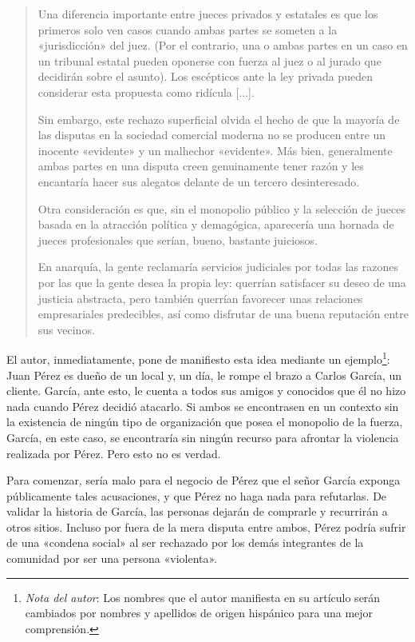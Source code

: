 \documentclass[12pt,a4paper,twoside]{book}
\begin{document}
\begin{quotation}
Una diferencia importante entre jueces privados y estatales es que los primeros solo ven casos cuando ambas partes se someten a la «jurisdicción» del juez. (Por el contrario, una o ambas partes en un caso en un tribunal estatal pueden oponerse con fuerza al juez o al jurado que decidirán sobre el asunto). Los escépticos ante la ley privada pueden considerar esta propuesta como ridícula [...].

Sin embargo, este rechazo superficial olvida el hecho de que la mayoría de las disputas en la sociedad comercial moderna no se producen entre un inocente «evidente» y un malhechor «evidente». Más bien, generalmente ambas partes en una disputa creen genuinamente tener razón y les encantaría hacer sus alegatos delante de un tercero desinteresado.

Otra consideración es que, sin el monopolio público y la selección de jueces basada en la atracción política y demagógica, aparecería una hornada de jueces profesionales que serían, bueno, bastante juiciosos.

En anarquía, la gente reclamaría servicios judiciales por todas las razones por las que la gente desea la propia ley: querrían satisfacer su deseo de una justicia abstracta, pero también querrían favorecer unas relaciones empresariales predecibles, así como disfrutar de una buena reputación entre sus vecinos. \cite{justicia-privada}
\end{quotation}

El autor, inmediatamente, pone de manifiesto esta idea mediante un ejemplo\footnote{\textit{Nota del autor}: Los nombres que el autor manifiesta en su artículo serán cambiados por nombres y apellidos de origen hispánico para una mejor comprensión.}: Juan Pérez es dueño de un local y, un día, le rompe el brazo a Carlos García, un cliente. García, ante esto, le cuenta a todos sus amigos y conocidos que él no hizo nada cuando Pérez decidió atacarlo. Si ambos se encontrasen en un contexto sin la existencia de ningún tipo de organización que posea el monopolio de la fuerza, García, en este caso, se encontraría sin ningún recurso para afrontar la violencia realizada por Pérez. Pero esto no es verdad.

Para comenzar, sería malo para el negocio de Pérez que el señor García exponga públicamente tales acusaciones, y que Pérez no haga nada para refutarlas. De validar la historia de García, las personas dejarán de comprarle y recurrirán a otros sitios. Incluso por fuera de la mera disputa entre ambos, Pérez podría sufrir de una «condena social» al ser rechazado por los demás integrantes de la comunidad por ser una persona «violenta».
\end{document}
